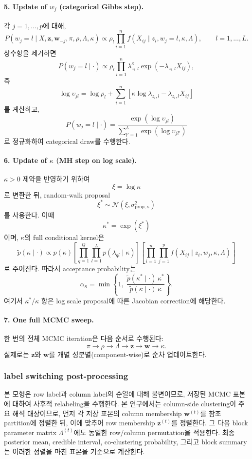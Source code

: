 \documentclass[A4paper,11pt]{article}
\begin{document}
\paragraph*{5. Update of $w_j$ (categorical Gibbs step).}
각 $j=1,\ldots,p$에 대해,
\[
P(w_j=l \mid X,\mathbf{z},\mathbf{w}_{-j},\pi,\rho,\Lambda,\kappa)
\propto
\rho_l
\prod_{i=1}^{n}
f(X_{ij}\mid z_i,w_j=l,\kappa,\Lambda),
\qquad l=1,\ldots,L.
\]
상수항을 제거하면
\[
P(w_j=l \mid \cdot)
\propto
\rho_l
\prod_{i=1}^{n}
\lambda_{z_i,l}^{\kappa}
\exp(-\lambda_{z_i,l}X_{ij}),
\]
즉
\[
\log \upsilon_{jl}
=
\log \rho_l
+
\sum_{i=1}^{n}
\left[
\kappa \log \lambda_{z_i,l}
-
\lambda_{z_i,l}X_{ij}
\right]
\]
를 계산하고,
\[
P(w_j=l\mid \cdot)=\frac{\exp(\log\upsilon_{jl})}{\sum_{l'=1}^{L}\exp(\log\upsilon_{jl'})}
\]
로 정규화하여 categorical draw를 수행한다.

\paragraph*{6. Update of $\kappa$ (MH step on log scale).}
$\kappa>0$ 제약을 반영하기 위하여
\[
\xi = \log \kappa
\]
로 변환한 뒤, random-walk proposal
\[
\xi^{*} \sim \mathcal{N}(\xi,\sigma_{\text{prop},\kappa}^{2})
\]
를 사용한다. 이때
\[
\kappa^{*} = \exp(\xi^{*})
\]
이며, $\kappa$의 full conditional kernel은
\[
\tilde p(\kappa\mid \cdot)
\propto
p(\kappa)
\left[
\prod_{q=1}^{Q}\prod_{l=1}^{L}
p(\lambda_{ql}\mid \kappa)
\right]
\left[
\prod_{i=1}^{n}\prod_{j=1}^{p}
f(X_{ij}\mid z_i,w_j,\kappa,\Lambda)
\right]
\]
로 주어진다. 따라서 acceptance probability는
\[
\alpha_{\kappa}
=
\min\left\{
1,\;
\frac{\tilde p(\kappa^{*}\mid \cdot)\,\kappa^{*}}
{\tilde p(\kappa\mid \cdot)\,\kappa}
\right\}.
\]
여기서 $\kappa^{*}/\kappa$ 항은 log scale proposal에 따른 Jacobian correction에 해당한다.

\paragraph*{7. One full MCMC sweep.}
한 번의 전체 MCMC iteration은 다음 순서로 수행된다:
\[
\pi
\rightarrow
\rho
\rightarrow
\Lambda
\rightarrow
\mathbf{z}
\rightarrow
\mathbf{w}
\rightarrow
\kappa.
\]
실제로는 $\mathbf{z}$와 $\mathbf{w}$를 개별 성분별(component-wise)로 순차 업데이트한다.

\subsubsection{label switching post-processing}

본 모형은 row label과 column label의 순열에 대해 불변이므로, 저장된 MCMC 표본에 대하여 사후적 relabeling을 수행한다. 본 연구에서는 column-side clustering이 주요 해석 대상이므로, 먼저 각 저장 표본의 column membership $\mathbf{w}^{(t)}$를 참조 partition에 정렬한 뒤, 이에 맞추어 row membership $\mathbf{z}^{(t)}$를 정렬한다. 그 다음 block parameter matrix $\Lambda^{(t)}$에도 동일한 row/column permutation을 적용한다. 최종 posterior mean, credible interval, co-clustering probability, 그리고 block summary는 이러한 정렬을 마친 표본을 기준으로 계산한다.
\end{document}
